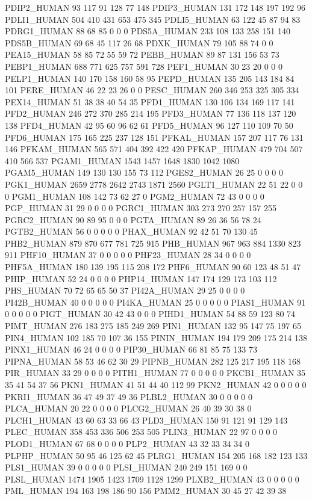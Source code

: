 PDIP2_HUMAN	93	117	91	128	77	148
PDIP3_HUMAN	131	172	148	197	192	96
PDLI1_HUMAN	504	410	431	653	475	345
PDLI5_HUMAN	63	122	45	87	94	83
PDRG1_HUMAN	88	68	85	0	0	0
PDS5A_HUMAN	233	108	133	258	151	140
PDS5B_HUMAN	69	68	45	117	26	68
PDXK_HUMAN	79	105	88	74	0	0
PEA15_HUMAN	58	85	72	55	59	72
PEBB_HUMAN	89	87	131	156	53	73
PEBP1_HUMAN	688	771	625	757	591	728
PEF1_HUMAN	30	23	20	0	0	0
PELP1_HUMAN	140	170	158	160	58	95
PEPD_HUMAN	135	205	143	184	84	101
PERE_HUMAN	46	22	23	26	0	0
PESC_HUMAN	260	346	253	325	305	334
PEX14_HUMAN	51	38	38	40	54	35
PFD1_HUMAN	130	106	134	169	117	141
PFD2_HUMAN	246	272	370	285	214	195
PFD3_HUMAN	77	136	118	137	120	138
PFD4_HUMAN	42	95	60	96	62	61
PFD5_HUMAN	96	127	110	109	70	50
PFD6_HUMAN	175	165	225	237	128	151
PFKAL_HUMAN	157	207	117	76	131	146
PFKAM_HUMAN	565	571	404	392	422	420
PFKAP_HUMAN	479	704	507	410	566	537
PGAM1_HUMAN	1543	1457	1648	1830	1042	1080
PGAM5_HUMAN	149	130	130	155	73	112
PGES2_HUMAN	26	25	0	0	0	0
PGK1_HUMAN	2659	2778	2642	2743	1871	2560
PGLT1_HUMAN	22	51	22	0	0	0
PGM1_HUMAN	108	142	73	62	27	0
PGM2_HUMAN	72	43	0	0	0	0
PGP_HUMAN	31	29	0	0	0	0
PGRC1_HUMAN	303	273	270	257	157	255
PGRC2_HUMAN	90	89	95	0	0	0
PGTA_HUMAN	89	26	36	56	78	24
PGTB2_HUMAN	56	0	0	0	0	0
PHAX_HUMAN	92	42	51	70	130	45
PHB2_HUMAN	879	870	677	781	725	915
PHB_HUMAN	967	963	884	1330	823	911
PHF10_HUMAN	37	0	0	0	0	0
PHF23_HUMAN	28	34	0	0	0	0
PHF5A_HUMAN	180	139	195	115	208	172
PHF6_HUMAN	90	60	123	48	51	47
PHIP_HUMAN	52	24	0	0	0	0
PHP14_HUMAN	147	174	129	173	103	112
PHS_HUMAN	70	72	65	65	50	37
PI42A_HUMAN	29	25	0	0	0	0
PI42B_HUMAN	40	0	0	0	0	0
PI4KA_HUMAN	25	0	0	0	0	0
PIAS1_HUMAN	91	0	0	0	0	0
PIGT_HUMAN	30	42	43	0	0	0
PIHD1_HUMAN	54	88	59	123	80	74
PIMT_HUMAN	276	183	275	185	249	269
PIN1_HUMAN	132	95	147	75	197	65
PIN4_HUMAN	102	185	70	107	36	155
PININ_HUMAN	194	179	209	175	214	138
PINX1_HUMAN	46	24	0	0	0	0
PIP30_HUMAN	66	81	85	75	133	73
PIPNA_HUMAN	58	53	46	62	30	29
PIPNB_HUMAN	282	125	217	195	118	168
PIR_HUMAN	33	29	0	0	0	0
PITH1_HUMAN	77	0	0	0	0	0
PKCB1_HUMAN	35	35	41	54	37	56
PKN1_HUMAN	41	51	44	40	112	99
PKN2_HUMAN	42	0	0	0	0	0
PKRI1_HUMAN	36	47	49	37	49	36
PLBL2_HUMAN	30	0	0	0	0	0
PLCA_HUMAN	20	22	0	0	0	0
PLCG2_HUMAN	26	40	39	30	38	0
PLCH1_HUMAN	43	60	63	33	66	43
PLD3_HUMAN	150	91	121	91	129	143
PLEC_HUMAN	358	453	336	506	253	505
PLIN3_HUMAN	22	97	0	0	0	0
PLOD1_HUMAN	67	68	0	0	0	0
PLP2_HUMAN	43	32	33	34	34	0
PLPHP_HUMAN	50	95	46	125	62	45
PLRG1_HUMAN	154	205	168	182	123	133
PLS1_HUMAN	39	0	0	0	0	0
PLSI_HUMAN	240	249	151	169	0	0
PLSL_HUMAN	1474	1905	1423	1709	1128	1299
PLXB2_HUMAN	43	0	0	0	0	0
PML_HUMAN	194	163	198	186	90	156
PMM2_HUMAN	30	45	27	42	39	38
